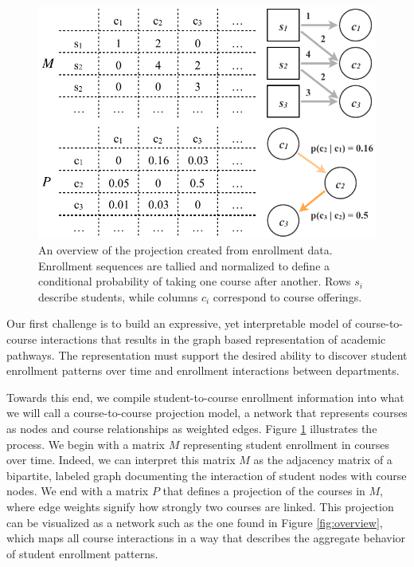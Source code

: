 \documentclass{sigchi}
\begin{document}
\begin{figure}
    \centering
    \includegraphics[width=\columnwidth]{Figs/final-simple.pdf}
    \caption{An overview of the projection created from enrollment
      data. Enrollment sequences are tallied and normalized to define
      a conditional probability of taking one course after
      another. Rows $s_i$ describe students, while columns $c_i$
      correspond to course offerings.}
    \label{fig:simple}
\end{figure}

Our first challenge is to build an expressive, yet interpretable model
of course-to-course interactions that results in the graph based
representation of academic pathways. The representation must support
the desired ability to discover student enrollment patterns over time
and enrollment interactions between departments. 

Towards this end, we compile student-to-course enrollment information
into what we will call a course-to-course projection model, a network
that represents courses as nodes and course relationships as weighted
edges. Figure \ref{fig:simple} illustrates the process. We begin with
a matrix $M$ representing student enrollment in courses over
time. Indeed, we can interpret this matrix $M$ as the adjacency matrix
of a bipartite, labeled graph documenting the interaction of student
nodes with course nodes.  We end with a matrix $P$ that defines a
projection of the courses in $M$, where edge weights signify how
strongly two courses are linked. This projection can be visualized as a network such as the one found in Figure \ref{fig:overview}, which maps all course interactions in a way that describes the aggregate behavior of student enrollment patterns.
\end{document}
